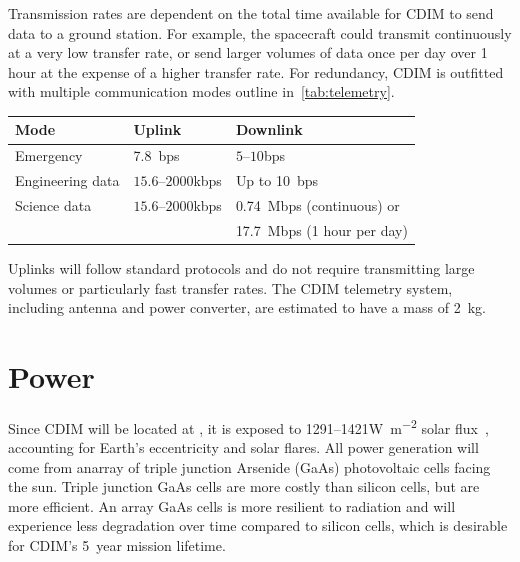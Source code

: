 \documentclass{ws-jai}
\begin{document}
Transmission rates are dependent on the total time available for CDIM to send data to a ground station.
For example, the spacecraft could transmit continuously at a very low transfer rate, or send larger volumes of data once per day over 1 hour at the expense of a higher transfer rate.
For redundancy, CDIM is outfitted with multiple communication modes outline in~\autoref{tab:telemetry}.

\begin{wstable}[htb]
  \caption{Downlink transfer rates reflect estitmates based on the target of \SI{606.2}{Gb/day}.
  Typical data transfer rates are outlined for uplinks~\cite{smad2015}.
\label{tab:telemetry}}
  \begin{tabular}{@{}lll@{}} \toprule
    Mode & Uplink & Downlink \\ \midrule
    Emergency & \SI{7.8}{bps} & $5$--$10$\si{bps} \\
    Engineering data & $15.6$--$2000$\si{kbps} & Up to \SI{10}{bps} \\
    Science data & $15.6$--$2000$\si{kbps} & \SI{0.74}{Mbps} (continuous) or \\
    & & \SI{17.7}{Mbps} (1 hour per day)\\\bottomrule
  \end{tabular}
\end{wstable}

Uplinks will follow standard protocols and do not require transmitting large volumes or particularly fast transfer rates.
The CDIM telemetry system, including antenna and power converter, are estimated to have a mass of \SI{2}{kg}.

\section{Power}
\label{sec:power}
Since CDIM will be located at \Ltwo, it is exposed to 1291--1421\si{\watt\per\meter\squared} solar flux~\cite{evans2002natural}, accounting for Earth's eccentricity and solar flares.
All power generation will come from anarray of triple junction Arsenide (GaAs) photovoltaic cells facing the sun.
Triple junction GaAs cells are more costly than silicon cells, but are more efficient.
An array GaAs cells is more resilient to radiation and will experience less degradation over time compared to silicon cells, which is desirable for CDIM's \SI{5}{year} mission lifetime.
\end{document}
